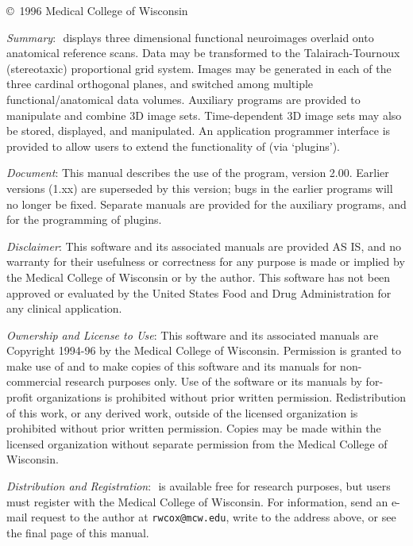 \centerline{\copyright\ 1996 Medical College of Wisconsin}

\vspace{1.1ex}
\noindent
{\it Summary\/}:
\MCW$\!$ \afnit displays three dimensional functional
neuroimages overlaid onto anatomical reference scans.
Data may be transformed to the Talairach-Tournoux (stereotaxic)
proportional grid system.
Images may be generated in each of the three cardinal orthogonal planes,
and switched among multiple functional/anatomical data volumes.
Auxiliary programs are provided to manipulate and combine 3D image sets.
Time-dependent 3D image sets may also be stored, displayed, and manipulated.
An application programmer interface is provided to allow users to extend
the functionality of \afnit (via `plugins').

\vspace{1.1ex}
\noindent
{\it Document\/}:
This manual describes the use of the \afnit program, version 2.00.
Earlier versions (1.xx) are superseded by this version;
bugs in the earlier programs will no longer be fixed.
Separate manuals are provided for the auxiliary programs, and for the
programming of plugins.

\vspace{1.1ex}
\noindent
{\it Disclaimer\/}:
This software and its associated manuals are provided AS IS, and no warranty for
their usefulness or correctness for any purpose is made or implied by the
Medical College of Wisconsin or by the author.
This software has not been approved or evaluated by the United States
Food and Drug Administration for any clinical application.

\vspace{1.1ex}
\noindent
{\it Ownership and License to Use\/}:
This software and its associated manuals are Copyright 1994-96
by the Medical College of Wisconsin.  Permission is granted to make use of
and to make copies
of this software and its manuals for non-commercial research purposes only.
Use of the software or its manuals by for-profit organizations is
prohibited without prior written permission.
Redistribution of this work, or any derived work, outside
of the licensed organization is prohibited without prior
written permission.  Copies may be made within the licensed organization
without separate permission from the Medical College of Wisconsin.

\vspace{1.1ex}
\noindent
{\it Distribution and Registration\/}:
\MCW$\!$ \afnit is available free for research purposes, but users
must register with the Medical College of Wisconsin.
For information, send an e-mail request to the author at
{\tt rwcox@mcw.edu}, write to the address above, or see the
final page of this manual.

